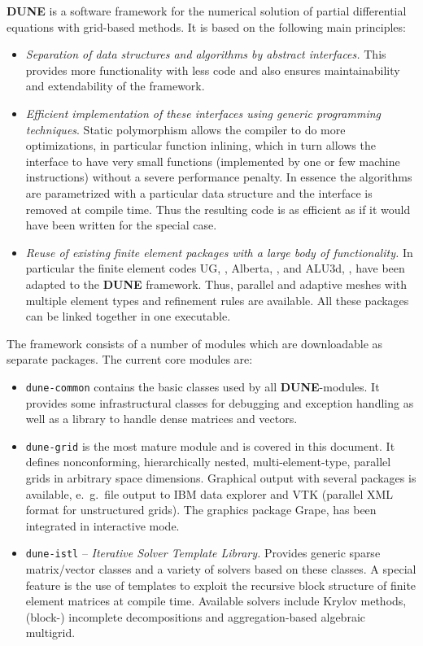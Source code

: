 \documentclass[11pt,a4paper,headinclude,footinclude,DIV16,normalheadings]{scrreprt}
\newcommand{\Dune}{{\sf\bfseries DUNE}}
\begin{document}
\Dune{} is a software framework for the numerical solution of partial
differential equations with grid-based methods. It is based on the
following main principles:
\begin{itemize}
\item \textit{Separation of data structures and
algorithms by abstract interfaces.} This provides more functionality
with less code and also ensures maintainability and
extendability of the framework.
\item \textit{Efficient implementation of these
interfaces using generic programming techniques}. Static polymorphism
allows the compiler to do more optimizations, in particular function
inlining, which in turn allows the interface to have very small
functions (implemented by one or few machine instructions) without a
severe performance penalty. In essence the algorithms are parametrized
with a particular data structure and the interface is removed at
compile time. Thus the resulting code is as efficient as if it would
have been written for the special case.
\item \textit{Reuse of existing finite element packages with a large body of
functionality.} In particular the finite element codes UG, \cite{ug},
Alberta, \cite{Alberta}, and ALU3d, \cite{ALU3d}, have been
adapted to the \Dune{} framework. Thus, parallel and adaptive meshes with
multiple element types and refinement rules are available. All these
packages can be linked together in one executable.
\end{itemize}

The framework consists of a number of modules which are downloadable
as separate packages.  The current core modules are:
\begin{itemize}
\item \texttt{dune-common} contains the basic classes used by all
  \Dune{}-modules.  It provides some infrastructural classes for
  debugging and exception handling as well as a library to handle
  dense matrices and vectors.
\item \texttt{dune-grid} is the most mature module and is covered in
  this document. It defines nonconforming, hierarchically nested,
  multi-element-type, parallel grids in arbitrary space dimensions.
  Graphical output with several packages is available, e.~g.~file
  output to IBM data explorer and VTK (parallel XML format for
  unstructured grids). The graphics package Grape, \cite{Grape} has
  been integrated in interactive mode.
\item \texttt{dune-istl} -- \textit{Iterative Solver Template
    Library.} Provides generic sparse matrix/vector classes and a
  variety of solvers based on these classes. A special feature is the
  use of templates to exploit the recursive block structure of finite
  element matrices at compile time. Available solvers include Krylov
  methods, (block-) incomplete decompositions and aggregation-based
  algebraic multigrid.
\end{itemize}
\end{document}

